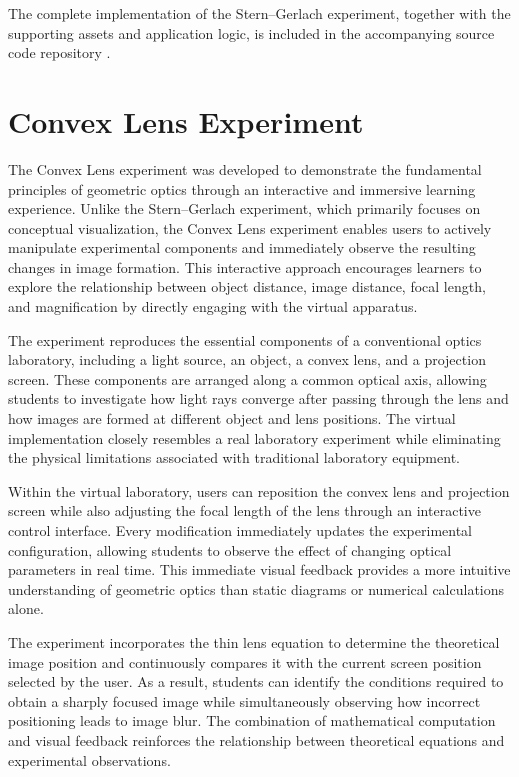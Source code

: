 The complete implementation of the Stern--Gerlach experiment, together with the supporting assets and application logic, is included in the accompanying source code repository \cite{thesisRepo}.

\section{Convex Lens Experiment}

The Convex Lens experiment was developed to demonstrate the fundamental principles of geometric optics through an interactive and immersive learning experience. Unlike the Stern--Gerlach experiment, which primarily focuses on conceptual visualization, the Convex Lens experiment enables users to actively manipulate experimental components and immediately observe the resulting changes in image formation. This interactive approach encourages learners to explore the relationship between object distance, image distance, focal length, and magnification by directly engaging with the virtual apparatus.

The experiment reproduces the essential components of a conventional optics laboratory, including a light source, an object, a convex lens, and a projection screen. These components are arranged along a common optical axis, allowing students to investigate how light rays converge after passing through the lens and how images are formed at different object and lens positions. The virtual implementation closely resembles a real laboratory experiment while eliminating the physical limitations associated with traditional laboratory equipment.

Within the virtual laboratory, users can reposition the convex lens and projection screen while also adjusting the focal length of the lens through an interactive control interface. Every modification immediately updates the experimental configuration, allowing students to observe the effect of changing optical parameters in real time. This immediate visual feedback provides a more intuitive understanding of geometric optics than static diagrams or numerical calculations alone.

The experiment incorporates the thin lens equation to determine the theoretical image position and continuously compares it with the current screen position selected by the user. As a result, students can identify the conditions required to obtain a sharply focused image while simultaneously observing how incorrect positioning leads to image blur. The combination of mathematical computation and visual feedback reinforces the relationship between theoretical equations and experimental observations.

